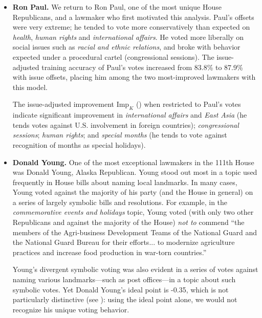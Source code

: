 \begin{itemize}
  \item \textbf{Ron Paul.}
We return to Ron Paul, one of the most unique House Republicans, and a
lawmaker who first motivated this analysis.  Paul's offsets were very
extreme; he tended to vote more conservatively than expected on
\emph{health}, \emph{human rights} and \emph{international affairs}.
He voted more liberally on social issues such as \emph{racial and
  ethnic relations}, and broke with behavior expected under a
procedural cartel (congressional sessions).
The issue-adjusted training accuracy of Paul's votes increased from
83.8\% to 87.9\% with issue offsets, placing him among the two
most-improved lawmakers with this model. %

The issue-adjusted improvement $\mbox{Imp}_K$
() when restricted to
Paul's votes indicate significant improvement in \emph{international
  affairs} and \emph{East Asia} (he tends votes against
U.S. involvement in foreign countries); \emph{congressional sessions};
\emph{human rights}; and \emph{special months} (he tends to vote
against recognition of months as special holidays).

\item \textbf{Donald Young.}  One of the most exceptional lawmakers
  in the 111th House was Donald Young, Alaska Republican.  Young stood
  out most in a topic used frequently in House bills about naming
  local landmarks. In many cases, Young voted against the majority of
  his party (and the House in general) on a series of largely symbolic
  bills and resolutions.  For example, in the \emph{commemorative
    events and holidays} topic, Young voted (with only two other
  Republicans and against the majority of the House) \emph{not to}
  commend ``the members of the Agri-business Development Teams of the
  National Guard and the National Guard Bureau for their efforts... to
  modernize agriculture practices and increase food production in
  war-torn countries.'' %

  Young's divergent symbolic voting was also evident in a series of
  votes against naming various landmarks---such as post offices---in
  a topic about such symbolic votes. Yet Donald Young's ideal point is
  -0.35, which is not particularly distinctive (see
  ): using the ideal point
  alone, we would not recognize his unique voting behavior.
\end{itemize}


